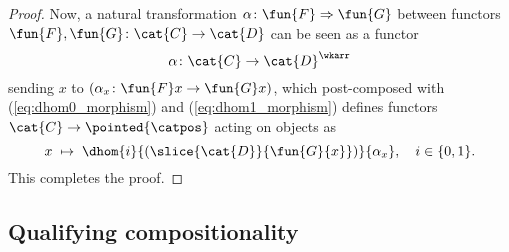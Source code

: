 \begin{proof}
    Now, a natural transformation $\alpha\colon \fun{F} \Rightarrow \fun{G}$ between functors $\fun{F}, \fun{G}\colon \cat{C} \to \cat{D}$ can be seen as a functor
    \begin{equation*}
        \alpha\colon \cat{C} \to \cat{D}^\wkarr
    \end{equation*}
    sending $x$ to $(\alpha_x\colon \fun{F}x \to \fun{G}x)$, which post-composed with (\ref{eq:dhom0_morphism}) and (\ref{eq:dhom1_morphism}) defines functors $\cat{C} \to \pointed{\catpos}$ acting on objects as
    \begin{equation*}
        x \; \mapsto \; \dhom{i}{(\slice{\cat{D}}{\fun{G}{x}})}{\alpha_x}, \quad i \in \{ 0, 1 \}.
    \end{equation*}
    This completes the proof.
    \end{proof}


\subsection*{Qualifying compositionality}

